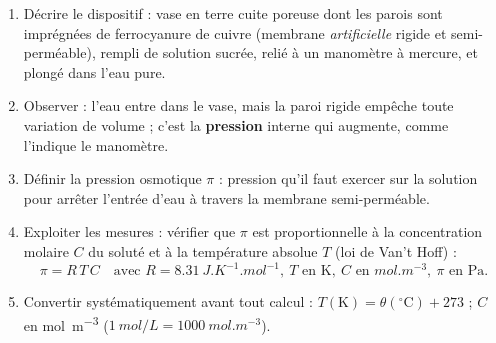 \documentclass[11pt]{article}
\newcommand{\cle}[1]{{\popxbold\color{popdark}#1}}
\begin{document}
\begin{methode}
\begin{enumerate}
\item \cle{Décrire le dispositif} : vase en terre cuite poreuse dont les parois sont imprégnées de ferrocyanure de cuivre (membrane \emph{artificielle} rigide et semi-perméable), rempli de solution sucrée, relié à un manomètre à mercure, et plongé dans l'eau pure.
\item \cle{Observer} : l'eau entre dans le vase, mais la paroi rigide empêche toute variation de volume ; c'est la \textbf{pression} interne qui augmente, comme l'indique le manomètre.
\item \cle{Définir la pression osmotique} $\pi$ : pression qu'il faut exercer sur la solution pour arrêter l'entrée d'eau à travers la membrane semi-perméable.
\item \cle{Exploiter les mesures} : vérifier que $\pi$ est proportionnelle à la concentration molaire $C$ du soluté et à la température absolue $T$ (loi de Van't Hoff) :
\[ \pi = R\,T\,C \quad \text{avec } R = \SI{8,31}{J.K^{-1}.mol^{-1}},\ T \text{ en K},\ C \text{ en } \si{mol.m^{-3}},\ \pi \text{ en Pa}. \]
\item \cle{Convertir} systématiquement avant tout calcul : $T(\mathrm{K}) = \theta(^{\circ}\mathrm{C}) + 273$ ; $C$ en \si{mol.m^{-3}} ($\SI{1}{mol/L} = \SI{1000}{mol.m^{-3}}$).
\end{enumerate}
\end{methode}
\end{document}
